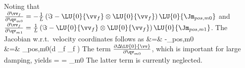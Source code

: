     Noting that $\frac{\partial \vv_{f} }{\partial \qv_{m0}} = 
    -\frac{1}{L}\left(\Im - \LU{0}{\vv_{f}} \otimes \LU{0}{\vv_{f}} \right) \LU{0}{\Jm_{pos,m0}}$ and 
    $\frac{\partial \vv_{f} }{\partial \qv_{m1}} = 
    \frac{1}{L}\left(\Im - \LU{0}{\vv_{f}} \otimes \LU{0}{\vv_{f}} \right) \LU{0}{\Jm_{pos,m1}}$.
    The Jacobian w.r.t.\ velocity coordinates follows as
    \bea
      &=& -\Jm_{pos,m0}\tp {}
      \nonumber \\
      &=& \Jm_{pos,m0}\tp \left(d \vv_{f} \otimes \vv_{f} \right)  
    \eea
    The term $\frac{\partial \Delta\! \LU{0}{\vv}}{\partial \qv_{m0}}$, which is important for large damping, yields
    \be
       = 
      =
       \dot \qv_{m0}
    \ee
    The latter term is currently neglected.
    
